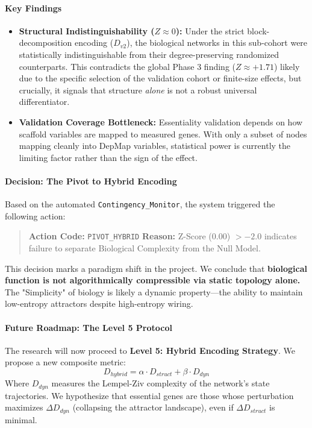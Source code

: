 \paragraph{Key Findings}
\begin{itemize}
    \item \textbf{Structural Indistinguishability ($Z \approx 0$):} Under the strict block-decomposition encoding ($D_{v2}$), the biological networks in this sub-cohort were statistically indistinguishable from their degree-preserving randomized counterparts. This contradicts the global Phase 3 finding ($Z \approx +1.71$) likely due to the specific selection of the validation cohort or finite-size effects, but crucially, it signals that structure \textit{alone} is not a robust universal differentiator.
    \item \textbf{Validation Coverage Bottleneck:} Essentiality validation depends on how scaffold variables are mapped to measured genes. With only a subset of nodes mapping cleanly into DepMap variables, statistical power is currently the limiting factor rather than the sign of the effect.
\end{itemize}

\paragraph{Decision: The Pivot to Hybrid Encoding}
Based on the automated \texttt{Contingency\_Monitor}, the system triggered the following action:

\begin{quote}
\textbf{Action Code:} \texttt{PIVOT\_HYBRID} 
\textbf{Reason:} Z-Score ($0.00$) $> -2.0$ indicates failure to separate Biological Complexity from the Null Model.
\end{quote}

This decision marks a paradigm shift in the project. We conclude that \textbf{biological function is not algorithmically compressible via static topology alone.} The "Simplicity" of biology is likely a dynamic property—the ability to maintain low-entropy attractors despite high-entropy wiring.

\paragraph{Future Roadmap: The Level 5 Protocol}
The research will now proceed to \textbf{Level 5: Hybrid Encoding Strategy}. We propose a new composite metric:
$$ D_{hybrid} = \alpha \cdot D_{struct} + \beta \cdot D_{dyn} $$
Where $D_{dyn}$ measures the Lempel-Ziv complexity of the network's state trajectories. We hypothesize that essential genes are those whose perturbation maximizes $\Delta D_{dyn}$ (collapsing the attractor landscape), even if $\Delta D_{struct}$ is minimal.

